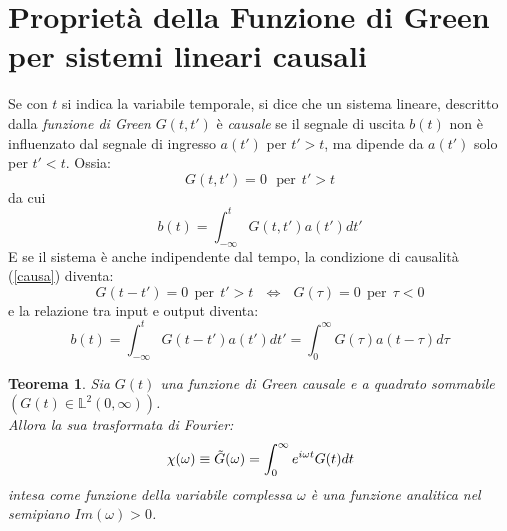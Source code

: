 \documentclass[twoside]{article}
\newtheorem{theorem}{Teorema}[section]
\begin{document}
\section{Proprietà della Funzione di Green per sistemi lineari causali}

Se con $t$ si indica la variabile temporale, si dice che un sistema lineare, descritto dalla \textit{funzione di Green} $G(t,t')$ è \textit{causale} se il segnale di uscita $b(t)$ non è influenzato dal segnale di ingresso $a(t')$ per $t'>t$, ma dipende da $a(t')$ solo per $t'<t$.
Ossia:
\begin{equation}\label{causa}
    G(t,t')=0 \ \ \ \text{per} \ \ t'>t
\end{equation}
da cui
\begin{equation}
    b(t)=\int_{-\infty}^t G(t,t')a(t')dt'
\end{equation}
E se il sistema è anche indipendente dal tempo, la condizione di causalità (\ref{causa}) diventa:
\begin{equation}
    G(t-t')=0 \ \ \text{per} \ \ t'>t \ \ \ \iff \ \ \ G(\tau)=0 \ \ \text{per} \ \ \tau<0
\end{equation}
e la relazione tra input e output diventa:
\begin{equation}
    b(t)=\int_{-\infty}^t G(t-t')a(t')dt'=\int_0 ^{\infty}G(\tau)a(t-\tau)d\tau
\end{equation}

\begin{theorem}
Sia $G(t)$ una \textit{funzione di Green} causale e a quadrato sommabile $(G(t)\in \mathds{L}^2(0,\infty))$.
\\
Allora la sua trasformata di Fourier:
\begin{equation}
    \chi(\omega)\equiv \Tilde{G}(\omega)=\int_0^{\infty} e^{i\omega t}G(t)dt
\end{equation}
intesa come funzione della variabile complessa $\omega$ è una funzione analitica nel semipiano $Im(\omega)>0$.
\end{theorem}
\end{document}
